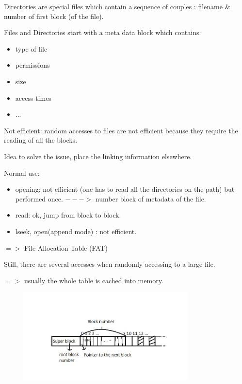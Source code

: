 Directories are special files which contain a sequence of couples : filename \& number of first block (of the file).

Files and Directories start with a meta data block which contains:
\begin{itemize}
  \item type of file
  \item permissions
  \item size
  \item access times
  \item ...
\end{itemize}

Not efficient: random accesses to files are not efficient because they require the reading of all the blocks.

Idea to solve the issue, place the linking information elsewhere.

Normal use:
\begin{itemize}
  \item opening: not efficient (one has to read all the directories on the path) but performed once. $--->$ number block of metadata of the file.
  \item read: ok, jump from block to block.
  \item lseek, open(append mode) :   not efficient.
\end{itemize}

$=>$ File Allocation Table (FAT)

Still, there are several accesses when randomly accessing to a large file.

$=>$ usually the whole table is cached into memory.

\begin{figure}[h!]
  \begin{center}
    \includegraphics[width=0.8\textwidth]{fat_2.jpg}
  \end{center}
\end{figure}

